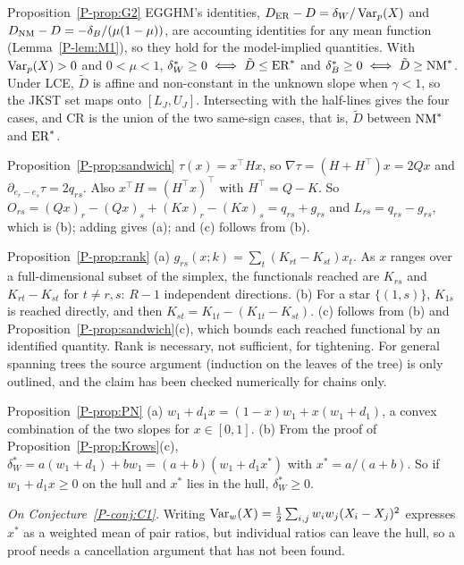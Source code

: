 \begin{proofof}{Proposition~\ref{P-prop:G2}}
EGGHM's identities, $D_{\mathrm{ER}}-D=\delta_W/\operatorname{Var}_p(X)$ and $D_{\mathrm{NM}}-D=-\delta_B/(\mu(1-\mu))$,
are accounting identities for any mean function (Lemma~\ref{P-lem:M1}), so they hold for
the model-implied quantities. With $\operatorname{Var}_p(X)>0$ and $0<\mu<1$, $\delta^*_W\ge0\iff\tilde
D\le\mathrm{ER}^*$ and $\delta^*_B\ge0\iff\tilde D\ge\mathrm{NM}^*$. Under LCE, $\tilde D$ is affine and
non-constant in the unknown slope when $\gamma<1$, so the JKST set maps onto $[L_J,U_J]$.
Intersecting with the half-lines gives the four cases, and CR is the union of the two
same-sign cases, that is, $\tilde D$ between $\mathrm{NM}^*$ and $\mathrm{ER}^*$.
\end{proofof}

\begin{proofof}{Proposition~\ref{P-prop:sandwich}}
$\tau(x)=x^\top Hx$, so $\nabla\tau=(H+H^\top)x=2Qx$ and
$\partial_{e_r-e_s}\tau=2q_{rs}$. Also $x^\top H=(H^\top x)^\top$ with $H^\top=Q-K$. So
$O_{rs}=(Qx)_r-(Qx)_s+(Kx)_r-(Kx)_s=q_{rs}+g_{rs}$ and $L_{rs}=q_{rs}-g_{rs}$, which is
(b); adding gives (a); and (c) follows from (b).
\end{proofof}

\begin{proofof}{Proposition~\ref{P-prop:rank}}
(a) $g_{rs}(x;k)=\sum_t(K_{rt}-K_{st})x_t$. As $x$ ranges over a full-dimensional subset of
the simplex, the functionals reached are $K_{rs}$ and $K_{rt}-K_{st}$ for $t\ne r,s$:
$R-1$ independent directions. (b) For a star $\{(1,s)\}$, $K_{1s}$ is reached directly,
and then $K_{st}=K_{1t}-(K_{1t}-K_{st})$. (c) follows from (b) and
Proposition~\ref{P-prop:sandwich}(c), which bounds each reached functional by an
identified quantity. Rank is necessary, not sufficient, for tightening. For general
spanning trees the source argument (induction on the leaves of the tree) is only
outlined, and the claim has been checked numerically for chains only.
\end{proofof}

\begin{proofof}{Proposition~\ref{P-prop:PN}}
(a) $w_1+d_1x=(1-x)w_1+x(w_1+d_1)$, a convex combination of the two slopes for
$x\in[0,1]$. (b) From the proof of Proposition~\ref{P-prop:Krows}(c),
$\delta^*_W=a(w_1+d_1)+bw_1=(a+b)(w_1+d_1x^*)$ with $x^*=a/(a+b)$. So if
$w_1+d_1x\ge0$ on the hull and $x^*$ lies in the hull, $\delta^*_W\ge0$.
\end{proofof}

\emph{On Conjecture~\ref{P-conj:C1}.} Writing
$\operatorname{Var}_w(X)=\tfrac12\sum_{i,j}w_iw_j(X_i-X_j)^2$ expresses $x^*$ as a weighted mean of
pair ratios, but individual ratios can leave the hull, so a proof needs a cancellation
argument that has not been found.

